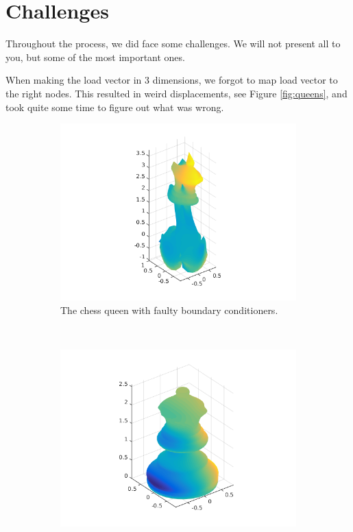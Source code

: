 \section{Challenges}

Throughout the process, we did face some challenges. We will not present all to you, but some of the most important ones. 

When making the load vector in 3 dimensions, we forgot to map load vector to the right nodes. This resulted in weird displacements, see Figure \ref{fig:queens}, and took quite some time to figure out what was wrong. 



\begin{figure}[ht]
        \centering
        \begin{subfigure}[b]{0.45 \textwidth}
                \includegraphics[width=\textwidth]{queen_broken}
                \caption{The chess queen with faulty boundary conditioners.}
        \end{subfigure}
        ~
        \begin{subfigure}[b]{0.45 \textwidth}
                \includegraphics[width=\textwidth]{queen_fixed}

\end{subfigure}
\end{figure}
